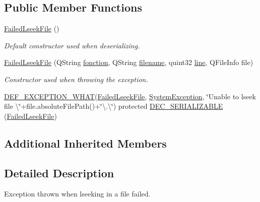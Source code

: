 \subsection*{Public Member Functions}
\begin{DoxyCompactItemize}
\item 
\hyperlink{class_gost_crypt_1_1_failed_lseek_file_a73488da3a20d8071267b1f47e9cba861}{Failed\+Lseek\+File} ()
\begin{DoxyCompactList}\small\item\em Default constructor used when deserializing. \end{DoxyCompactList}\item 
\hyperlink{class_gost_crypt_1_1_failed_lseek_file_aa383cc647f7958a297ca94d3b7f566b9}{Failed\+Lseek\+File} (Q\+String \hyperlink{class_gost_crypt_1_1_gost_crypt_exception_a29b8c93d5efbb1ff369107385725a939}{fonction}, Q\+String \hyperlink{class_gost_crypt_1_1_gost_crypt_exception_a749a12375f4ba9d502623b99d8252f38}{filename}, quint32 \hyperlink{class_gost_crypt_1_1_gost_crypt_exception_abf506d911f12a4e969eea500f90bd32c}{line}, Q\+File\+Info file)
\begin{DoxyCompactList}\small\item\em Constructor used when throwing the exception. \end{DoxyCompactList}\item 
\hyperlink{_gost_crypt_exception_8h_a5bc1e1c6c9d6f46c84eeba49e33355f9}{D\+E\+F\+\_\+\+E\+X\+C\+E\+P\+T\+I\+O\+N\+\_\+\+W\+H\+AT}(\hyperlink{class_gost_crypt_1_1_failed_lseek_file}{Failed\+Lseek\+File}, \hyperlink{class_gost_crypt_1_1_system_exception}{System\+Exception}, \char`\"{}Unable to lseek file \textbackslash{}\char`\"{}+file.\+absolute\+File\+Path()+\char`\"{}\textbackslash{}.\textbackslash{}\char`\"{}) protected \hyperlink{class_gost_crypt_1_1_failed_lseek_file_a41b0f246514775e24e3ec7a0e19656cc}{D\+E\+C\+\_\+\+S\+E\+R\+I\+A\+L\+I\+Z\+A\+B\+LE} (\hyperlink{class_gost_crypt_1_1_failed_lseek_file}{Failed\+Lseek\+File})
\end{DoxyCompactItemize}
\subsection*{Additional Inherited Members}


\subsection{Detailed Description}
Exception thrown when lseeking in a file failed. 

